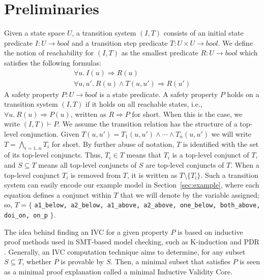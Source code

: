 \section{Preliminaries}
\label{sec:background}

\newcommand{\ivc}{\textit{IVC}}
\newcommand{\mivc}{\textit{MIVC}}
\newcommand{\bool}[0]{\mathit{bool}}
\newcommand{\reach}[0]{\mathit{R}}
\newcommand{\ite}[3]{\mathit{if}\ {#1}\ \mathit{then}\ {#2}\ \mathit{else}\ {#3}}

Given a state space $U$, a transition system $(I,T)$ consists of an
initial state predicate $I : U \to \bool$ and a transition step
predicate $T : U \times U \to \bool$.
We define the notion of
reachability for $(I, T)$ as the smallest predicate $\reach : U \to
\bool$ which satisfies the following formulas:
\begin{gather*}
  \forall u.~ I(u) \Rightarrow \reach(u) \\
  \forall u, u'.~ \reach(u) \land T(u, u') \Rightarrow \reach(u')
\end{gather*}
A safety property $P : U \to \bool$ is a state predicate. A safety
property $P$ holds on a transition system $(I, T)$ if it holds on all
reachable states, i.e., $\forall u.~ \reach(u) \Rightarrow P(u)$,
written as $\reach \Rightarrow P$ for short. When this is the case, we
write $(I, T)\vdash P$. We assume the transition relation has the structure of a top-level conjunction.  Given $T(u, u') = T_1(u, u') \land \cdots \land T_n(u, u')$ we will write $T = \bigwedge_{i=1..n}T_i$ for short.
By further abuse of notation,
$T$ is identified with the set of its top-level conjuncts. Thus, $T_i \in
T$ means that $T_i$ is a top-level conjunct of $T$, and $S
\subseteq T$ means all top-level conjuncts of $S$ are top-level
conjuncts of $T$. When a top-level conjunct $T_i$ is removed from $T$, it is written as $T \setminus \{T_i\}$. Such a transition system can easily encode our example model in Section~\ref{sec:example}, where each equation defines a conjunct within $T$ that we will denote by the variable assigned; so, $T = \{$ {\small \texttt{a1\_below, a2\_below, a1\_above, a2\_above, one\_below, both\_above, doi\_on, on\_p}} $\}$.

The idea behind finding an IVC for a given property $P$ \cite{Ghass16} is based on inductive proof methods used in SMT-based model checking, such as K-induction and PDR \cite{NFM2012:KaGaTiWh, amla2005analysis, Een2011:PDR}. Generally, an IVC computation technique aims to determine, for any subset $S \subseteq T$, whether $P$ is provable by $S$. Then, a minimal subset that satisfies $P$ is seen as a minimal proof explanation called a minimal Inductive Validity Core.

